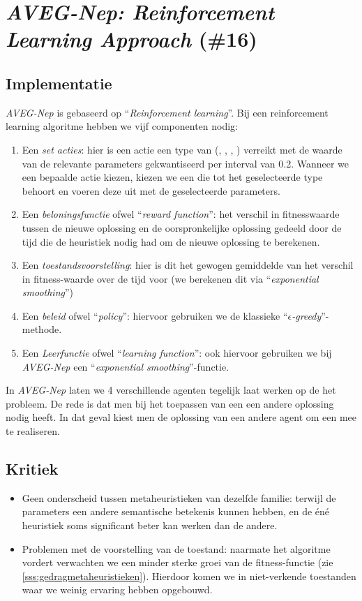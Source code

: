 \section{\emph{AVEG-Nep: Reinforcement Learning Approach} (\#16)}
\label{sss:aveg-nep}
\subsection{Implementatie}
\emph{AVEG-Nep}\cite{chesc-aveg-nep} is gebaseerd op ``\emph{Reinforcement learning}''\cite{rlaiacaml}. Bij een reinforcement learning algoritme hebben we vijf componenten nodig:
\begin{enumerate}
 \item Een \emph{set acties}: hier is een actie een type van \abllhn{} (\abmt{}, \abls{}, \abco{}, \abrr{}) verreikt met de waarde van de relevante parameters gekwantiseerd per interval van 0.2. Wanneer we een bepaalde actie kiezen, kiezen we een \abllh{} die tot het geselecteerde type behoort en voeren deze uit met de geselecteerde parameters.
 \item Een \emph{beloningsfunctie} ofwel ``\emph{reward function}'': het verschil in fitnesswaarde tussen de nieuwe oplossing en de oorspronkelijke oplossing gedeeld door de tijd die de heuristiek nodig had om de nieuwe oplossing te berekenen.
 \item Een \emph{toestandsvoorstelling}: hier is dit het gewogen gemiddelde van het verschil in fitness-waarde over de tijd voor (we berekenen dit via ``\emph{exponential smoothing}''\cite{Taylor2003a})
 \item Een \emph{beleid} ofwel ``\emph{policy}'': hiervoor gebruiken we de klassieke ``\emph{$\epsilon$-greedy}''-methode.
 \item Een \emph{Leerfunctie} ofwel ``\emph{learning function}'': ook hiervoor gebruiken we bij \emph{AVEG-Nep} een ``\emph{exponential smoothing}''-functie.
\end{enumerate}
In \emph{AVEG-Nep} laten we 4 verschillende agenten tegelijk laat werken op de het probleem. De rede is dat men bij het toepassen van een \abco{} \abh{} een andere oplossing nodig heeft. In dat geval kiest men de oplossing van een andere agent om een \abco{} mee te realiseren.
\subsection{Kritiek}
\begin{itemize}
 \item Geen onderscheid tussen metaheuristieken van dezelfde familie: terwijl de parameters een andere semantische betekenis kunnen hebben, en de \'en\'e heuristiek soms significant beter kan werken dan de andere.
 \item Problemen met de voorstelling van de toestand: naarmate het algoritme vordert verwachten we een minder sterke groei van de fitness-functie (zie \ref{sss:gedragmetaheuristieken}). Hierdoor komen we in niet-verkende toestanden waar we weinig ervaring hebben opgebouwd.
\end{itemize}
